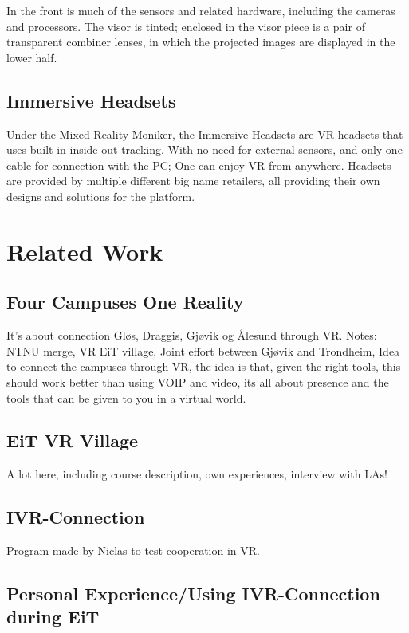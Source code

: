     In the front is much of the sensors and related hardware, including the cameras and processors. The visor is tinted; enclosed in the visor piece is a pair of transparent combiner lenses, in which the projected images are displayed in the lower half. %

    \subsection{Immersive Headsets}
    Under the Mixed Reality Moniker, the Immersive Headsets are VR headsets that uses built-in inside-out tracking. With no need for external sensors, and only one cable for connection with the PC; One can enjoy VR from anywhere. 
    Headsets are provided by multiple different big name retailers, all providing their own designs and solutions for the platform.

\section{Related Work}
    \subsection{Four Campuses One Reality}
    It's about connection Gløs, Draggis, Gjøvik og Ålesund through VR.
    Notes: NTNU merge, VR EiT village, Joint effort between Gjøvik and Trondheim, Idea to connect the campuses through VR, the idea is that, given the right tools, this should work better than using VOIP and video, its all about presence and the tools that can be given to you in a virtual world.
    
    \subsection{EiT VR Village}
    A lot here, including course description, own experiences, interview with LAs!

    \subsection{IVR-Connection}
    Program made by Niclas to test cooperation in VR.
    
    \subsection{Personal Experience/Using IVR-Connection during EiT}
    
    
